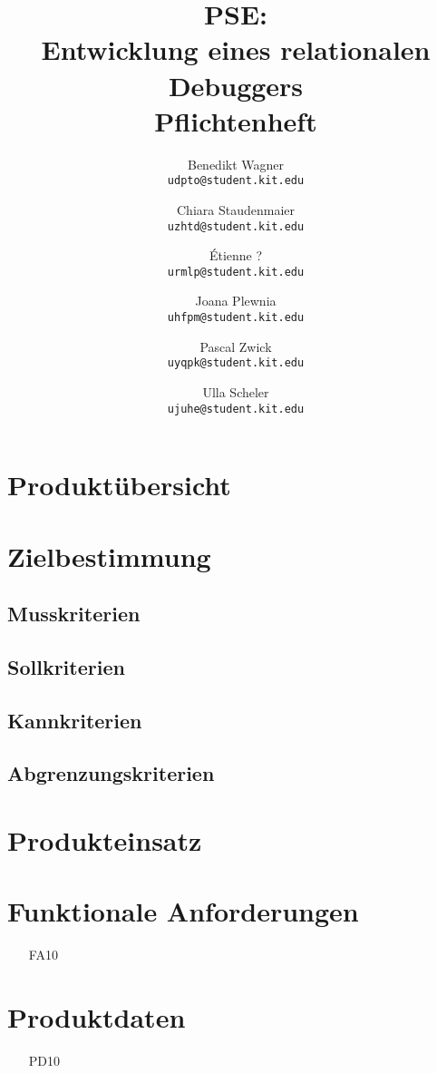 \documentclass[parskip=full]{scrartcl}
\title{PSE:\\ Entwicklung eines relationalen Debuggers\\ Pflichtenheft}
\author{
	Benedikt Wagner\\
	\texttt{udpto@student.kit.edu}
	\and Chiara Staudenmaier\\
	\texttt{uzhtd@student.kit.edu}
	\and Étienne ?\\
	\texttt{urmlp@student.kit.edu}
	\and Joana Plewnia\\
	\texttt{uhfpm@student.kit.edu} 
	\and Pascal Zwick\\
	\texttt{uyqpk@student.kit.edu}
	\and Ulla Scheler\\
	\texttt{ujuhe@student.kit.edu}
}
\begin{document}
\maketitle

\section{Produktübersicht}

\section{Zielbestimmung}
\subsection{Musskriterien}
\subsection{Sollkriterien}
\subsection{Kannkriterien}
\subsection{Abgrenzungskriterien}

\section{Produkteinsatz}

\section{Funktionale Anforderungen}
\begin{itemize}[nosep]
\item[FA10] %
\end{itemize}

\section{Produktdaten}
\begin{itemize}[nosep]
\item[PD10] %
\end{itemize}
\end{document}
